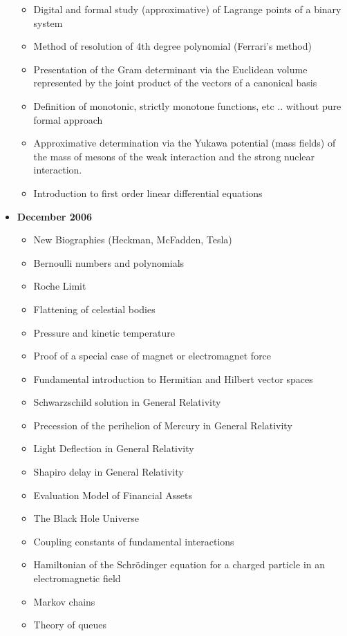 \documentclass[12pt,a4paper,twoside,openright]{report}
\theoremstyle{definition}
\theoremstyle{itexmp}
\numberwithin{equation}{section}
\begin{document}
\begin{itemize}
\begin{itemize}[noitemsep]
				\item Digital and formal study (approximative) of Lagrange points of a binary system
				\item Method of resolution of 4th degree polynomial (Ferrari's method)
				\item Presentation of the Gram determinant via the Euclidean volume represented by the joint product of the vectors of a canonical basis
				\item Definition of monotonic, strictly monotone functions, etc .. without pure formal approach
				\item Approximative determination via the Yukawa potential (mass fields) of the mass of mesons of the weak interaction and the strong nuclear interaction.
				\item Introduction to first order linear differential equations			
			\end{itemize}
		\item \textbf{December 2006}
			\begin{itemize}[noitemsep]
				\item New Biographies (Heckman, McFadden, Tesla)
				\item Bernoulli numbers and polynomials
				\item Roche Limit
				\item Flattening of celestial bodies
				\item Pressure and kinetic temperature
				\item Proof of a special case of magnet or electromagnet force
				\item Fundamental introduction to Hermitian and Hilbert vector spaces 
				\item Schwarzschild solution in General Relativity
				\item Precession of the perihelion of Mercury in General Relativity
				\item Light Deflection in General Relativity
				\item Shapiro delay in General Relativity
				\item Evaluation Model of Financial Assets
				\item The Black Hole Universe
				\item Coupling constants of fundamental interactions
				\item Hamiltonian of the Schrödinger equation for a charged particle in an electromagnetic field
				\item Markov chains
				\item Theory of queues

\end{itemize}
\end{itemize}
\end{document}
